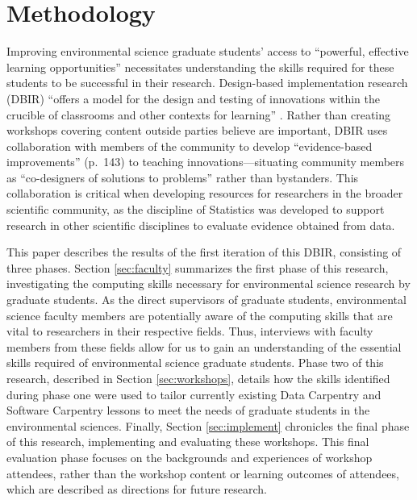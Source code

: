 \documentclass[12pt]{article}
\begin{document}
\section{Methodology}

\quad Improving environmental science graduate students' access to ``powerful,
effective learning opportunities'' \citep[p. 137]{penuel} necessitates
understanding the skills required for these students to be successful in their
research. Design-based implementation research (DBIR) \citep{confrey, penuel, 
oneill} ``offers a model for the design and testing of innovations within the
crucible of classrooms and other contexts for learning'' 
\citep[p.\ 140]{penuel}. Rather than creating workshops covering content outside
parties believe are important, DBIR uses collaboration with members of the
community to develop ``evidence-based improvements'' (p.\ 143) to teaching 
innovations---situating community members as ``co-designers of solutions to 
problems'' \citep[p. 140]{penuel} rather than bystanders. This collaboration 
is critical when developing resources for researchers in the broader scientific
community, as the discipline of Statistics was developed to support research in
other scientific disciplines to evaluate evidence obtained from data. 

\quad This paper describes the results of the first iteration of this DBIR, 
consisting of three phases. Section \ref{sec:faculty} summarizes the first phase
of this research, investigating the computing skills necessary for environmental
science research by graduate students. As the direct supervisors of graduate
students, environmental science faculty members are potentially aware of the
computing skills that are vital to researchers in their respective fields. Thus,
interviews with faculty members from these fields allow for us to gain an
understanding of the essential skills required of environmental science graduate
students. Phase two of this research, described in Section \ref{sec:workshops}, 
details how the skills identified during phase one were used to tailor
currently existing Data Carpentry \citep{data-carpentry} and Software Carpentry
\citep{software-carpentry} lessons to meet the needs of graduate students in the
environmental sciences. Finally, Section \ref{sec:implement} chronicles the
final phase of this research, implementing and evaluating these workshops. This
final evaluation phase focuses on the backgrounds and experiences of workshop
attendees, rather than the workshop content or learning outcomes of attendees,
which are described as directions for future research. 
\end{document}
